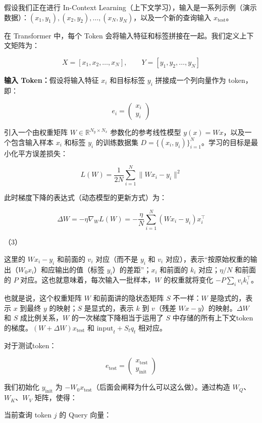 假设我们正在进行 In-Context Learning（上下文学习），输入是一系列示例（演示数据）：\((x_1,y_1),(x_2,y_2),\ldots,(x_N,y_N)\)，以及一个新的查询输入 \(x_{\mathrm{test}}\)。

在 Transformer 中，每个 Token 会将输入特征和标签拼接在一起。我们定义上下文矩阵为：

\[
X=[x_1,x_2,\ldots,x_N],\qquad Y=[y_1,y_2,\ldots,y_N]
\]

\textbf{输入 Token：}假设将输入特征 \(x_i\) 和目标标签 \(y_i\) 拼接成一个列向量作为 token，即：

\[
e_i=\begin{pmatrix}x_i\\y_i\end{pmatrix}
\]

引入一个由权重矩阵 \(W\in\mathbb{R}^{N_y\times N_x}\) 参数化的参考线性模型 \(y(x)=Wx\)，以及一个包含输入样本 \(x_i\) 和标签 \(y_i\) 的训练数据集 \(D=\{(x_i,y_i)\}_{i=1}^{N}\)。学习的目标是最小化平方误差损失：

\[
L(W)=\frac{1}{2N}\sum_{i=1}^{N}\|Wx_i-y_i\|^2
\]

此时梯度下降的表达式（动态模型的更新方式）为：

\[
\Delta W=-\eta\nabla_W L(W)=-\frac{\eta}{N}\sum_{i=1}^{N}(Wx_i-y_i)x_i^\top
\]

（3）

这里的 \(Wx_i-y_i\) 和前面的 \(v_i\) 对应（而不是 \(y_i\) 和 \(v_i\) 对应），表示``按原始权重的输出（\(W_0x_i\)）和应输出的值（标签 \(y_i\)）的差距''；\(x_i\) 和前面的 \(k_i\) 对应；\(\eta/N\) 和前面的 \(P\) 对应。这也就意味着，每次输入一批样本，\(W\) 的权重就将变化 \(-P\sum_i v_i k_i^\top\)。

也就是说，这个权重矩阵 \(W\) 和前面讲的隐状态矩阵 \(S\) 不一样：\(W\) 是隐式的，表示 \(x\) 到最终 \(y\) 的映射；\(S\) 是显式的，表示 \(k\) 到 \(v\)（残差 \(Wx-y\)）的映射。\(\Delta W\) 和 \(S\) 成比例关系，\(W\) 的一次梯度下降相当于运用了 \(S\) 中存储的所有上下文token的梯度。\((W+\Delta W)x_{\mathrm{test}}\) 和 \(\mathrm{input}_t+S_tq_t\) 相对应。

对于测试token：

\[
e_{\mathrm{test}}=\begin{pmatrix}x_{\mathrm{test}}\\y_{\mathrm{init}}\end{pmatrix}
\]

我们初始化 \(y_{\mathrm{init}}\) 为 \(-W_0x_{\mathrm{test}}\)（后面会阐释为什么可以这么做）。通过构造 \(W_Q\)、\(W_K\)、\(W_V\) 矩阵，使得：

当前查询 token \(j\) 的 Query 向量：

